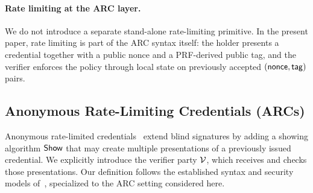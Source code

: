 
\paragraph{Rate limiting at the ARC layer.}
We do not introduce a separate stand-alone rate-limiting primitive. In the present paper, rate limiting is part of the
ARC syntax itself: the holder presents a credential together with a public nonce and a PRF-derived public tag, and the
verifier enforces the policy through local state on previously accepted \((\mathsf{nonce},\mathsf{tag})\) pairs.
\subsection{Anonymous Rate-Limiting Credentials (ARCs)}
\label{subsec:arc-security}
Anonymous rate-limited credentials~\cite{ietf-privacypass-arc-protocol-01} extend blind signatures by adding a showing algorithm \(\mathsf{Show}\) that may create
multiple presentations of a previously issued credential. We explicitly introduce the verifier party \(\mathcal{V}\),
which receives and checks those presentations. Our definition follows the established syntax and security models
of~\cite{JC:FucHanSla19,C:BLNS23}, specialized to the ARC setting considered here.

